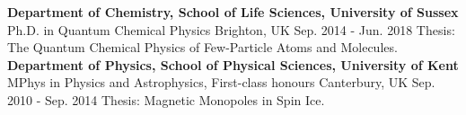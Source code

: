 


\begin{cventries}


\cventry
{\textbf{Department of Chemistry, School of Life Sciences, University of Sussex}} %
{Ph.D. in Quantum Chemical Physics} %
{Brighton, UK} %
{Sep. 2014 - Jun. 2018} %
{{Thesis:} The Quantum Chemical Physics of Few-Particle Atoms and Molecules.}
\vspace{0.4cm}
\cventry
{\textbf{Department of Physics, School of Physical Sciences, University of Kent} } %
{MPhys in Physics and Astrophysics, First-class honours} %
{Canterbury, UK} %
{Sep. 2010 - Sep. 2014} %
{{Thesis:} Magnetic Monopoles in Spin Ice.}


\end{cventries}
